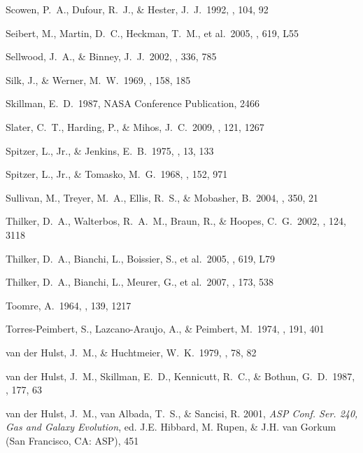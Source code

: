  Scowen, P.~A., Dufour, R.~J., \& Hester, J.~J.\ 1992, \aj, 104, 92 


 Seibert, M., Martin, D.~C., Heckman, T.~M., et al.\ 2005, \apjl, 619, L55 


 Sellwood, J.~A., \& Binney, J.~J.\ 2002, \mnras, 336, 785 


 Silk, J., \& Werner, M.~W.\ 1969, \apj, 158, 185 


 Skillman, E.~D.\ 1987, NASA Conference Publication, 2466

 Slater, C.~T., Harding, P., \& Mihos, J.~C.\ 2009, \pasp, 121, 1267 

 Spitzer, L., Jr., \& Jenkins, E.~B.\ 1975, \araa, 13, 133 


 Spitzer, L., Jr., \& Tomasko, M.~G.\ 1968, \apj, 152, 971 

 Sullivan, M., Treyer, M.~A., Ellis, R.~S., \& Mobasher, B.\ 2004, \mnras, 350, 21 

 Thilker, D.~A., Walterbos, R.~A.~M., Braun, R., \& Hoopes, C.~G.\ 2002, \aj, 124, 3118 


 Thilker, D.~A., Bianchi, L., Boissier, S., et al.\ 2005, \apjl, 619, L79 


 Thilker, D.~A., Bianchi, L., Meurer, G., et al.\ 2007, \apjs, 173, 538 

 Toomre, A.\ 1964, \apj, 139, 1217 

 Torres-Peimbert, S., Lazcano-Araujo, A., \& Peimbert, M.\ 1974, \apj, 191, 401 


 van der Hulst, J.~M., \& Huchtmeier, W.~K.\ 1979, \aap, 78, 82 

 van der Hulst, J.~M., Skillman, E.~D., Kennicutt, R.~C., \& Bothun, G.~D.\ 1987, \aap, 177, 63 

 van der Hulst, J.~M., van Albada, T.~S., \& Sancisi,
 R. 2001, \emph{ASP Conf. Ser. 240, Gas and Galaxy Evolution},
 ed. J.E. Hibbard, M. Rupen, \& J.H. van Gorkum (San Francisco, CA:
 ASP), 451

